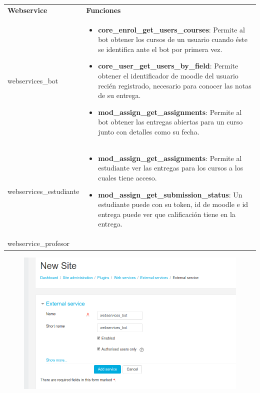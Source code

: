 \begin{enumerate}
\begin{tabular}{|p{5cm}|p{8cm}|}
\hline
\textbf{Webservice}
\newline

 &
 
\textbf{Funciones}
  \\
webservices\_bot
\newline

 &
 
\begin{itemize}
\item \textbf{core\_enrol\_get\_users\_courses}: Permite al bot obtener los cursos de un usuario cuando éste se identifica ante el bot por primera vez.
\item \textbf{core\_user\_get\_users\_by\_field}: Permite obtener el identificador de moodle del usuario recién registrado, necesario para conocer las notas de su entrega.
\item \textbf{mod\_assign\_get\_assignments}: Permite al bot obtener las entregas abiertas para un curso junto con detalles como su fecha.
\end{itemize}
  \\
webservices\_estudiante
\newline

 &
 
\begin{itemize}
\item \textbf{mod\_assign\_get\_assignments}: Permite al estudiante ver las entregas para los cursos a los cuales tiene acceso.
\item \textbf{mod\_assign\_get\_submission\_status}: Un estudiante puede con su token, id de moodle e id entrega puede ver que calificación tiene en la entrega.
\end{itemize}
  \\
webservice\_profesor
\newline

 &
 

  \\
  \hline
\end{tabular}

\begin{figure}[H] %
\centering
\includegraphics[scale=0.5]{imagenes/moodle/Screenshot_2017-08-25_11-24-11.png}  %


\end{figure}
\end{enumerate}
